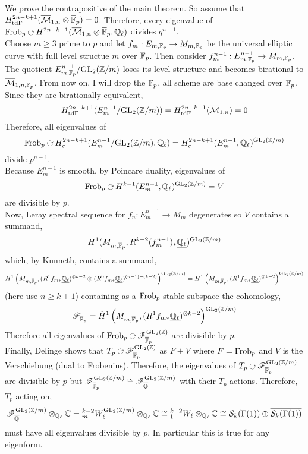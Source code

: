 \documentclass[12pt]{article}
\renewcommand{\C}{\mathbb{C}}
\begin{document}
We prove the contrapositive of the main theorem. So assume that $H^{2n - k + 1}_{\mathrm{tdF}}(\overline{\mathcal{M}}_{1,n} \otimes \overline{\mathbb{F}}_p) = 0$. Therefore, every eigenvalue of $\Frob_p \acts H^{2n - k + 1}(\barM_{1,n} \otimes \barF_p, \Q_\ell)$ divides $q^{n-1}$. 
\bigskip\\
Choose $m \ge 3$ prime to $p$ and let $f_m : E_{m, \mathbb{F}_p} \to M_{m, \mathbb{F}_p}$ be the universal elliptic curve with full level structue $m$ over $\mathbb{F}_p$. Then consider $f^{n-1}_m : E^{n-1}_{m, \mathbb{F}_p} \to M_{m, \mathbb{F}_p}$. The quotient $E^{n-1}_{m, \mathbb{F}_p} / \mathrm{GL}_{2}(\mathbb{Z}/m)$ loses its level structure and becomes birational to $\overline{\mathcal{M}}_{1,n, \mathbb{F}_p}$. From now on, I will drop the $\mathbb{F}_p$, all scheme are base changed over $\mathbb{F}_p$.
\bigskip\\
Since they are birationally equivalent,
\[ H^{2n - k + 1}_{\mathrm{tdF}}(E^{n-1}_{m} / \mathrm{GL}_{2}(\mathbb{Z}/m)) = H^{2n - k + 1}_{\mathrm{tdF}}(\overline{\mathcal{M}}_{1,n}) = 0 \]
Therefore, all eigenvalues of 
\[ \Frob_p \acts H^{2n - k + 1}_c(E^{n-1}_m / \GL{2}{\Z/m}, \Q_\ell) = H^{2n - k + 1}_c(E^{n-1}_m, \Q_\ell)^{\GL{2}{\Z/m} } \] divide $p^{n-1}$.
\bigskip\\
Because $E^{n-1}_m$ is smooth, by Poincare duality, eigenvalues of
\[ \Frob_p \acts H^{k-1}(E^{n-1}_m, \Q_\ell)^{\GL{2}{\Z/m}} = V \]
are divisible by $p$.
\bigskip\\
Now, Leray spectral sequence for $f_n : E^{n-1}_m \to M_m$ degenerates so $V$ contains a summand,
\[ H^1(M_{m, \overline{\mathbb{F}}_p}, R^{k-2} (f^{n-1}_m)_* \underline{\mathbb{Q}_\ell})^{\mathrm{GL}_{2}(\mathbb{Z}/m)} \]
which, by Kunneth, contains a summand,
\[ H^1\left(M_{m, \overline{\mathbb{F}}_p}, (R^1 f_{m*} \underline{\mathbb{Q}_\ell})^{\otimes k-2} \otimes (R^0 f_{m*} \underline{\mathbb{Q}_\ell} )^{(n-1) - (k-2)} \right)^{\mathrm{GL}_{2}(\mathbb{Z}/m)} = H^1 \left(M_{m, \overline{\mathbb{F}}_p}, (R^1 f_{m*} \underline{\mathbb{Q}_\ell})^{\otimes k - 2} \right)^{\mathrm{GL}_{2}(\mathbb{Z}/m)} \] 
(here use $n \ge k + 1$)
containing as a $\mathrm{Frob}_p$-stable subspace the cohomology,
\[ \mathscr{F}_{\overline{\mathbb{F}}_p} = \tilde{H}^1 \left(M_{m, \overline{\mathbb{F}}_p}, (R^1 f_{m*} \underline{\mathbb{Q}_\ell})^{\otimes k - 2} \right)^{\mathrm{GL}_{2}(\mathbb{Z}/m)} \]
Therefore all eigenvalues of $\Frob_p \acts \F_{\barF_p}^{\GL{2}{\Z}}$ are divisible by $p$. 
\bigskip\\
Finally, Delinge shows that $T_p \acts \F_{\barF_p}^{\GL{2}{\Z}}$ as $F + V$ where $F = \mathrm{Frob}_p$ and $V$ is the Verschiebung (dual to Frobenius).  Therefore, the eigenvalues of $T_p \acts \F_{\barF_p}^{\GL{2}{\Z/m}}$ are divisible by $p$ but $\mathscr{F}_{\overline{\mathbb{F}}_p}^{\mathrm{GL}_{2}(\mathbb{Z}/m)} \cong \mathscr{F}_{\overline{\mathbb{Q}}}^{\mathrm{GL}_{2}(\mathbb{Z}/m)}$ with their $T_p$-actions. Therefore, $T_p$ acting on,
\[ \F_{\overline{\Q}}^{\GL{2}{\Z/m}} \otimes_{\Q_\ell} \C = \W{k-2}{m}^{\GL{2}{\Z/m}} \otimes_{\Q_\ell} \C \cong \W{k-2}{1} \otimes_{\Q_\ell} \C \cong \S_k(\Gamma(1)) \oplus \overline{\S_k(\Gamma(1))} \]
must have all eigenvalues divisible by $p$. In particular this is true for any eigenform. 
\end{document}
